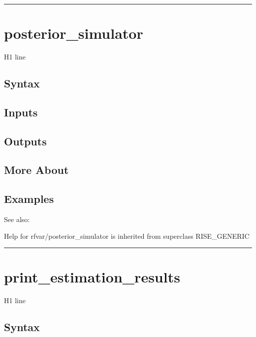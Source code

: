 \documentclass[letterpaper,10pt,english]{sphinxmanual}
\begin{document}
\bigskip\hrule{}\bigskip



\section{posterior\_simulator}
\label{classes/models/@rfvar/rfvar:posterior-simulator}\label{classes/models/@rfvar/rfvar:id85}
H1 line


\subsection{Syntax}
\label{classes/models/@rfvar/rfvar:id86}

\subsection{Inputs}
\label{classes/models/@rfvar/rfvar:id87}

\subsection{Outputs}
\label{classes/models/@rfvar/rfvar:id88}

\subsection{More About}
\label{classes/models/@rfvar/rfvar:id89}

\subsection{Examples}
\label{classes/models/@rfvar/rfvar:id90}
See also:

Help for rfvar/posterior\_simulator is inherited from superclass RISE\_GENERIC


\bigskip\hrule{}\bigskip



\section{print\_estimation\_results}
\label{classes/models/@rfvar/rfvar:id91}\label{classes/models/@rfvar/rfvar:print-estimation-results}
H1 line


\subsection{Syntax}
\label{classes/models/@rfvar/rfvar:id92}
\end{document}
